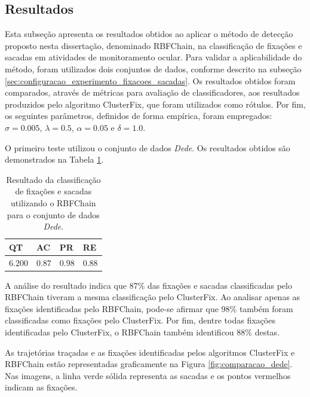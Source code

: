\documentclass[msc, classic, a4paper]{ufbathesis}
\begin{document}
\subsection{Resultados}

Esta subseção apresenta os resultados obtidos ao aplicar o método de detecção proposto nesta dissertação, denominado RBFChain, na classificação de fixações e sacadas em atividades de monitoramento ocular. 
Para validar a aplicabilidade do método, foram utilizados dois conjuntos de dados, conforme descrito na subseção \ref{sec:configuracao_experimento_fixacoes_sacadas}. 
Os resultados obtidos foram comparados, através de métricas para avaliação de classificadores, aos resultados produzidos pelo algoritmo ClusterFix, que foram utilizados como rótulos.
Por fim, os seguintes parâmetros, definidos de forma empírica, foram empregados: $\sigma = 0.005$, $\lambda = 0.5$, $\alpha = 0.05$ e $\delta = 1.0$.

O primeiro teste utilizou o conjunto de dados \textit{Dede}.
Os resultados obtidos são demonstrados na Tabela \ref{tbl:dede}.

\newpage

\begin{table}[ht!]
\centering
\caption{Resultado da classificação de fixações e sacadas utilizando o RBFChain para o conjunto de dados \textit{Dede}.}
\label{tbl:dede}
\begin{tabular}{llll}

\toprule
QT              & AC                     & PR                     & RE         \\ 
\midrule
$6.200$         & $0.87$                 & $0.98$                 & $0.88$      \\ 
\bottomrule

\end{tabular}
\end{table}

A análise do resultado indica que $87\%$ das fixações e sacadas classificadas pelo RBFChain tiveram a mesma classificação pelo ClusterFix. Ao analisar apenas as fixações identificadas pelo RBFChain, pode-se afirmar que $98\%$ também foram classificadas como fixações pelo ClusterFix. Por fim, dentre todas fixações identificadas pelo ClusterFix, o RBFChain também identificou $88\%$ destas.

As trajetórias traçadas e as fixações identificadas pelos algoritmos ClusterFix e RBFChain estão representadas graficamente na Figura \ref{fig:comparacao_dede}. Nas imagens, a linha verde sólida representa as sacadas e os pontos vermelhos indicam as fixações.
\end{document}
